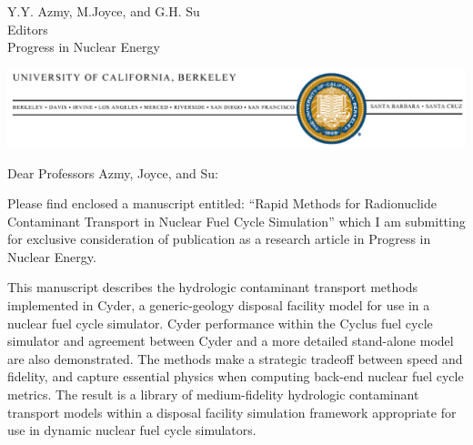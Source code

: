 \documentclass[10pt]{letter} %
\begin{document}

\begin{letter}{Y.Y. Azmy, M.Joyce, and G.H. Su\\
Editors\\
Progress in Nuclear Energy}


\vspace{-2cm}
\begin{center}
\includegraphics[width=\textwidth]{bk_logo.eps}
\end{center}

\address{Department of Nuclear Engineering\\
4155 Etcheverry Hall\\
MC 1730\\
University of California, Berkeley\\
Berkeley, CA 94720-1730}



\opening{Dear Professors Azmy, Joyce, and Su:}

Please find enclosed a manuscript entitled: ``Rapid Methods for Radionuclide
Contaminant Transport in Nuclear Fuel Cycle Simulation'' which I am submitting
for exclusive consideration of publication as a research article in Progress in
Nuclear Energy.

This manuscript describes the hydrologic contaminant transport methods
implemented in Cyder, a generic-geology disposal facility model for use in a
nuclear fuel cycle simulator. Cyder performance within the Cyclus fuel cycle
simulator and agreement between Cyder and a more detailed stand-alone model are
also demonstrated. The methods make a strategic tradeoff between speed and
fidelity, and capture essential physics when computing back-end nuclear fuel
cycle metrics. The result is a library of medium-fidelity hydrologic
contaminant transport models within a disposal facility simulation framework
appropriate for use in dynamic nuclear fuel cycle simulators.


\end{letter}
\end{document}
